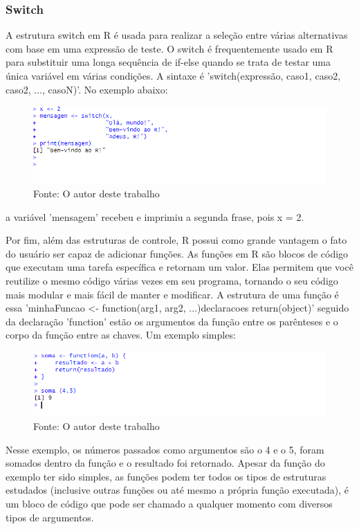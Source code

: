 		\subsubsection{Switch}
			A estrutura switch em R é usada para realizar a seleção entre várias alternativas com base em uma expressão de teste. O switch é frequentemente usado em R para substituir uma longa sequência de if-else quando se trata de testar uma única variável em várias condições. A sintaxe é 'switch(expressão, caso1, caso2, caso2, ..., casoN)'. No exemplo abaixo:\begin{figure}[H]
				\centering
				\caption{}
				\includegraphics[width=1.0\linewidth]{Prints/screenshot012}
				\label{fig:screenshot012}
				{\tiny \sf Fonte: O autor deste trabalho }
			\end{figure}
			a variável 'mensagem' recebeu e imprimiu a segunda frase, pois x = 2.\par 
	
	Por fim, além das estruturas de controle, R possui como grande vantagem o fato do usuário ser capaz de adicionar funções. As funções em R são blocos de código que executam uma tarefa específica e retornam um valor. Elas permitem que você reutilize o mesmo código várias vezes em seu programa, tornando o seu código mais modular e mais fácil de manter e modificar. A estrutura de uma função é essa 'minhaFuncao <- function(arg1, arg2, ...){declaracoes return(object)}' seguido da declaração 'function' estão os argumentos da função entre os parênteses e o corpo da função entre as chaves. Um exemplo simples:\begin{figure}[H]
		\centering
		\caption{}
		\includegraphics[width=1.0\linewidth]{Prints/screenshot013}
		\label{fig:screenshot013}
		{\tiny \sf Fonte: O autor deste trabalho }
	\end{figure}
	Nesse exemplo, os números passados como argumentos são o 4 e o 5, foram somados dentro da função e o resultado foi retornado. Apesar da função do exemplo ter sido simples, as funções podem ter todos os tipos de estruturas estudados (inclusive outras funções ou até mesmo a própria função executada), é um bloco de código que pode ser chamado a qualquer momento com diversos tipos de argumentos.

